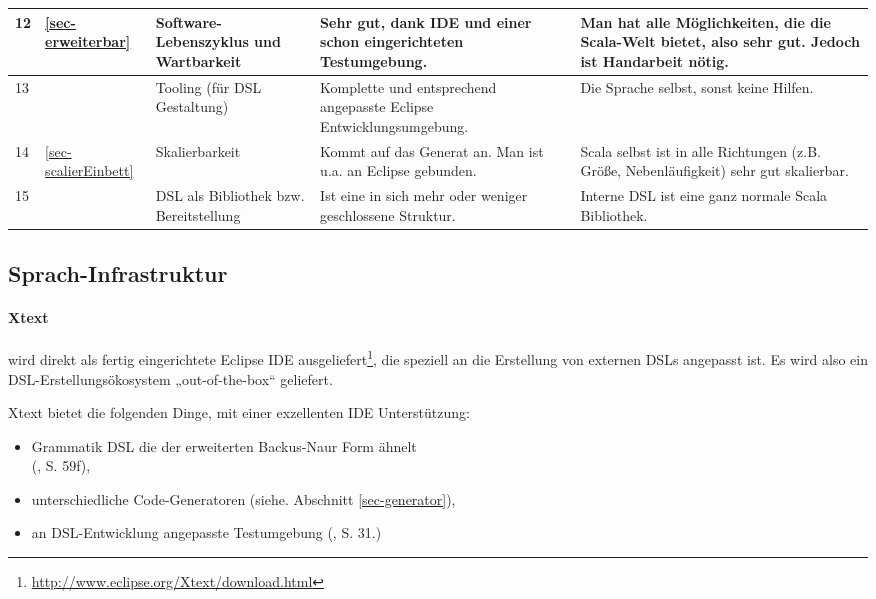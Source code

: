 \begin{landscape}
\begin{longtable}{|p{0.5cm}|p{0.8cm}|p{4.3cm}|p{6.3cm}|p{6.3cm}|}
  12
  & \ref{sec-erweiterbar}
  & Software-Lebenszyklus und Wartbarkeit
  & {\small Sehr gut, dank IDE und einer schon eingerichteten Testumgebung.}
  & {\small Man hat alle Möglichkeiten, die die Scala-Welt bietet, also sehr gut.
    Jedoch ist Handarbeit nötig.}
  \\\hline

  13
  &
  & Tooling (für DSL Gestaltung)
  & {\small Komplette und entsprechend angepasste Eclipse Entwicklungsumgebung.}
  & {\small Die Sprache selbst, sonst keine Hilfen.}
  \\\hline

  14
  & \ref{sec-scalierEinbett}
  & Skalierbarkeit
  & {\small Kommt auf das Generat an. Man ist u.a. an Eclipse gebunden.}
  & {\small Scala selbst ist in alle Richtungen (z.B. Größe, Nebenläufigkeit) sehr gut
    skalierbar.}
  \\\hline

  15
  &
  & DSL als Bibliothek bzw. Bereitstellung
  & {\small Ist eine in sich mehr oder weniger geschlossene Struktur.}
  & {\small Interne DSL ist eine ganz normale Scala Bibliothek.}
  \\\hline

\end{longtable}
\newpage
\end{landscape}


\subsection{Sprach-Infrastruktur}\label{sec-infrastruktur}

\paragraph{Xtext} wird direkt als fertig eingerichtete Eclipse IDE
ausgeliefert\footnote{\url{http://www.eclipse.org/Xtext/download.html}},
die speziell an die Erstellung von externen DSLs angepasst
ist. Es wird also ein DSL-Erstellungsökosystem „out-of-the-box“ geliefert.

Xtext bietet die folgenden Dinge, mit einer exzellenten IDE Unterstützung:

\begin{itemize}
  \item Grammatik DSL die der erweiterten Backus-Naur Form ähnelt\\
        (\cite{xtext}, S. 59f),
  \item unterschiedliche Code-Generatoren (siehe. Abschnitt \ref{sec-generator}),
  \item an DSL-Entwicklung angepasste Testumgebung (\cite{xtext}, S. 31.)
\end{itemize}

